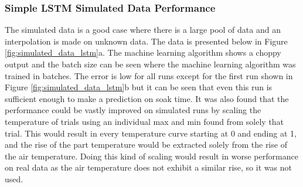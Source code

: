 \subsubsection{Simple LSTM Simulated Data Performance}
The simulated data is a good case where there is a large pool of data and an interpolation is made on unknown data. The data is presented below in Figure \ref{fig:simulated_data_lstm}a. The machine learning algorithm shows a choppy output and the batch size can be seen where the machine learning algorithm was trained in batches. The error is low for all runs except for the first run shown in Figure \ref{fig:simulated_data_lstm}b but it can be seen that even this run is sufficient enough to make a prediction on soak time. It was also found that the performance could be vastly improved on simulated runs by scaling the temperature of trials using an individual max and min found from solely that trial. This would result in every temperature curve starting at 0 and ending at 1, and the rise of the part temperature would be extracted solely from the rise of the air temperature. Doing this kind of scaling would result in worse performance on real data as the air temperature does not exhibit a similar rise, so it was not used. 

